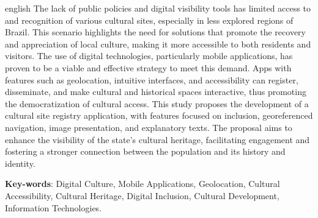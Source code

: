 \begin{resumo}[Abstract]			%
\begin{otherlanguage*}{english}		%
The lack of public policies and digital visibility tools has limited access to and recognition of various cultural sites, especially in less explored regions of Brazil. This scenario highlights the need for solutions that promote the recovery and appreciation of local culture, making it more accessible to both residents and visitors. The use of digital technologies, particularly mobile applications, has proven to be a viable and effective strategy to meet this demand. Apps with features such as geolocation, intuitive interfaces, and accessibility can register, disseminate, and make cultural and historical spaces interactive, thus promoting the democratization of cultural access. This study proposes the development of a cultural site registry application, with features focused on inclusion, georeferenced navigation, image presentation, and explanatory texts. The proposal aims to enhance the visibility of the state’s cultural heritage, facilitating engagement and fostering a stronger connection between the population and its history and identity.

\vspace{\onelineskip}
\noindent
\textbf{Key-words}: Digital Culture, Mobile Applications, Geolocation, Cultural Accessibility, Cultural Heritage, Digital Inclusion, Cultural Development, Information Technologies.
\end{otherlanguage*}
\end{resumo}

% 

%  
